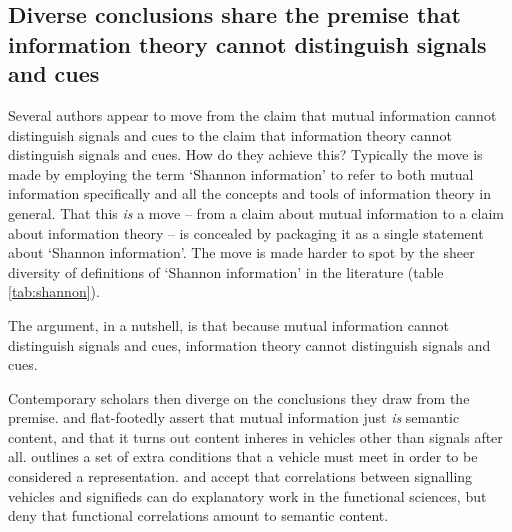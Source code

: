 
\subsection{Diverse conclusions share the premise that information theory cannot distinguish signals and cues}

Several authors appear to move from the claim that mutual information cannot distinguish signals and cues to the claim that information theory cannot distinguish signals and cues.
How do they achieve this?
Typically the move is made by employing the term `Shannon information' to refer to both mutual information specifically and all the concepts and tools of information theory in general.
That this \textit{is} a move -- from a claim about mutual information to a claim about information theory -- is concealed by packaging it as a single statement about `Shannon information'.
The move is made harder to spot by the sheer diversity of definitions of `Shannon information' in the literature (table \ref{tab:shannon}).

The argument, in a nutshell, is that because mutual information cannot distinguish signals and cues, information theory cannot distinguish signals and cues.

Contemporary scholars then diverge on the conclusions they draw from the premise.
\citet{skyrms2010signals} and \citet{isaac2018semantics} flat-footedly assert that mutual information just \textit{is} semantic content, and that it turns out content inheres in vehicles other than signals after all.
\citet[SECTION]{shea2018representation} outlines a set of extra conditions that a vehicle must meet in order to be considered a representation. 
\citet{lean2014shannon} and \citet[CHAPTER]{hutto2017evolving} accept that correlations between signalling vehicles and signifieds can do explanatory work in the functional sciences, but deny that functional correlations amount to semantic content.

